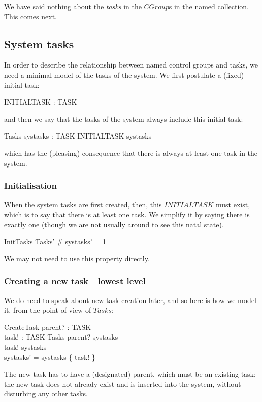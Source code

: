 \documentclass[a4paper,twoside,12pt]{article}
\begin{document}
We have said nothing about the \emph{tasks} in the $CGroup$s in the named collection.
This comes next.

\subsection{System tasks}
In order to describe the relationship between named control groups and tasks, we need a minimal model of the tasks of the system. We first postulate a (fixed) initial task:

\begin{axdef}{}
INITIALTASK : TASK
\end{axdef}
and then we say that the tasks of the system always include this initial task:

\begin{schema}{Tasks}
systasks : \finset TASK
\where
INITIALTASK \in systasks
\end{schema}
which has the (pleasing) consequence that there is always at least one task in the system.

\subsubsection{Initialisation}

When the system tasks are first created, then, this $INITIALTASK$ must exist, which is to say that there is at least one task. 
We simplify it by saying there is exactly one (though we are not usually around to see this natal state).

\begin{schema}{InitTasks}
Tasks'
\where
\# systasks' = 1
\end{schema}
We may not need to use this property directly.

\subsubsection{Creating a new task---lowest level}

We do need to speak about new task creation later, and so here is how we model it, from the point of view of $Tasks$:

\begin{schema}{CreateTask}
parent? : TASK \\
task! : TASK
\also
\Delta Tasks
\where
parent? \in systasks \\
task! \notin systasks \\
systasks' = systasks \cup \{ task! \}
\end{schema}
The new task has to have a (designated) parent, which must be an existing task; the new task does not already
exist and is inserted into the system, without disturbing any other tasks.
\end{document}

